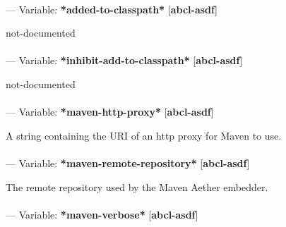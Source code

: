 \paragraph{}
\label{ABCL-ASDF:*ADDED-TO-CLASSPATH*}
--- Variable: \textbf{*added-to-classpath*} [\textbf{abcl-asdf}] \textit{}

\begin{adjustwidth}{5em}{5em}
not-documented
\end{adjustwidth}

\paragraph{}
\label{ABCL-ASDF:*INHIBIT-ADD-TO-CLASSPATH*}
--- Variable: \textbf{*inhibit-add-to-classpath*} [\textbf{abcl-asdf}] \textit{}

\begin{adjustwidth}{5em}{5em}
not-documented
\end{adjustwidth}

\paragraph{}
\label{ABCL-ASDF:*MAVEN-HTTP-PROXY*}
--- Variable: \textbf{*maven-http-proxy*} [\textbf{abcl-asdf}] \textit{}

\begin{adjustwidth}{5em}{5em}
A string containing the URI of an http proxy for Maven to use.
\end{adjustwidth}

\paragraph{}
\label{ABCL-ASDF:*MAVEN-REMOTE-REPOSITORY*}
--- Variable: \textbf{*maven-remote-repository*} [\textbf{abcl-asdf}] \textit{}

\begin{adjustwidth}{5em}{5em}
The remote repository used by the Maven Aether embedder.
\end{adjustwidth}

\paragraph{}
\label{ABCL-ASDF:*MAVEN-VERBOSE*}
--- Variable: \textbf{*maven-verbose*} [\textbf{abcl-asdf}] \textit{}

